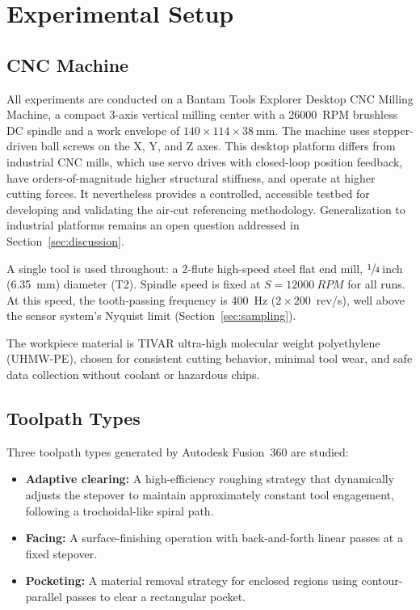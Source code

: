 \section{Experimental Setup}\label{sec:experimental_setup}

\subsection{CNC Machine}

All experiments are conducted on a Bantam Tools Explorer Desktop CNC Milling Machine, a compact 3-axis vertical milling center with a \SI{26000}{RPM} brushless DC spindle and a work envelope of $140 \times 114 \times \SI{38}{\milli\meter}$. The machine uses stepper-driven ball screws on the X, Y, and Z axes. This desktop platform differs from industrial CNC mills, which use servo drives with closed-loop position feedback, have orders-of-magnitude higher structural stiffness, and operate at higher cutting forces. It nevertheless provides a controlled, accessible testbed for developing and validating the air-cut referencing methodology. Generalization to industrial platforms remains an open question addressed in Section~\ref{sec:discussion}.

A single tool is used throughout: a 2-flute high-speed steel flat end mill, $\sfrac{1}{4}$\,inch (\SI{6.35}{\milli\meter}) diameter (T2). Spindle speed is fixed at $S = \SI{12000}{RPM}$ for all runs. At this speed, the tooth-passing frequency is \SI{400}{\hertz} ($2 \times 200$~rev/s), well above the sensor system's Nyquist limit (Section~\ref{sec:sampling}).

The workpiece material is TIVAR ultra-high molecular weight polyethylene (UHMW-PE), chosen for consistent cutting behavior, minimal tool wear, and safe data collection without coolant or hazardous chips.

\subsection{Toolpath Types}

Three toolpath types generated by Autodesk Fusion~360 are studied:

\begin{itemize}
    \item \textbf{Adaptive clearing:} A high-efficiency roughing strategy that dynamically adjusts the stepover to maintain approximately constant tool engagement, following a trochoidal-like spiral path.
    \item \textbf{Facing:} A surface-finishing operation with back-and-forth linear passes at a fixed stepover.
    \item \textbf{Pocketing:} A material removal strategy for enclosed regions using contour-parallel passes to clear a rectangular pocket.
\end{itemize}

